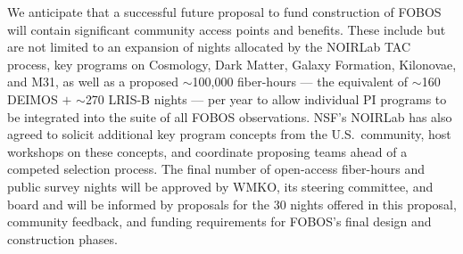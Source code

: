 \documentclass[oneside,11pt]{amsart}
\newcommand{\arcmin}{\mbox{$^{\prime}$}}
\DeclareRobustCommand{\lesssim}{%
\mathrel{\hskip-.5em\begin{array}{c}<\\[-8pt]\sim\end{array}\hskip-.5em}}
\begin{document}
We anticipate that a successful future proposal to fund construction of FOBOS will contain significant community access points and benefits. These include but are not limited to an expansion of nights allocated by the NOIRLab TAC process, key programs on Cosmology, Dark Matter, Galaxy Formation, Kilonovae, and M31, as well as a proposed $\sim$100,000 fiber-hours --- the equivalent of
$\sim$160 DEIMOS $+$ $\sim$270 LRIS-B nights --- per year to allow individual PI programs to be integrated into the
suite of all FOBOS observations.  NSF's NOIRLab has also agreed to solicit additional key program concepts from the
U.S.\ community, host workshops on these concepts, and coordinate proposing teams ahead of a competed selection
process.  The final number of open-access fiber-hours and public survey nights will be approved by WMKO, its
steering committee, and board and will be informed by proposals for the 30 nights offered in this proposal, community feedback, and funding requirements for FOBOS's final design and construction phases.


\end{document}

